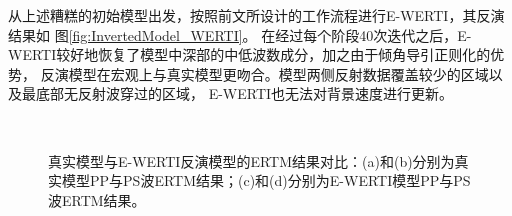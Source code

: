 从上述糟糕的初始模型出发，按照前文所设计的工作流程进行E-WERTI，其反演结果如
图\ref{fig:InvertedModel_WERTI}。
在经过每个阶段40次迭代之后，E-WERTI较好地恢复了模型中深部的中低波数成分，加之由于倾角导引正则化的优势，
反演模型在宏观上与真实模型更吻合。模型两侧反射数据覆盖较少的区域以及最底部无反射波穿过的区域，
E-WERTI也无法对背景速度进行更新。
\begin{figure}[!htb]
   \centering
   \\
   \caption{真实模型与E-WERTI反演模型的ERTM结果对比：(a)和(b)分别为真实模型PP与PS波ERTM结果；(c)和(d)分别为E-WERTI模型PP与PS波ERTM结果。}
   \label{fig:ERTM_comparison}
\end{figure}
